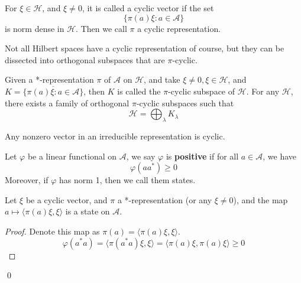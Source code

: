 \begin{definition}
    For $\xi\in\mathcal{H}$, and $\xi\neq 0$, it is called a cyclic vector if the set
    \begin{equation*}
        \{\pi(a)\xi: a\in\mathcal{A}\}
    \end{equation*}
    is norm dense in $\mathcal{H}$. Then we call $\pi$ a cyclic representation.
\end{definition}
Not all Hilbert spaces have a cyclic representation of course, but they can be dissected into orthogonal subspaces that are $\pi$-cyclic.
\begin{proposition}
    Given a *-representation $\pi$ of $\mathcal{A}$ on $\mathcal{H}$, and take $\xi\neq 0, \xi\in\mathcal{H}$, and $K=\overline{\{\pi(a)\xi: a\in\mathcal{A}\}}$, then $K$ is called the $\pi$-cyclic subspace of $\mathcal{H}$. For any $\mathcal{H}$, there exists a family of orthogonal $\pi$-cyclic subspaces such that 
    \begin{equation*}
        \mathcal{H}=\bigoplus_\lambda K_\lambda
    \end{equation*} 
\end{proposition}
\begin{remark}
    Any nonzero vector in an irreducible representation is cyclic.
\end{remark}

\begin{definition}[state]
    Let $\varphi$ be a linear functional on $\mathcal{A}$, we say $\varphi$ is \textbf{positive} if for all $a\in\mathcal{A}$, we have
    \begin{equation*}
        \varphi(aa^*)\geq 0
    \end{equation*}
    Moreover, if $\varphi$ has norm 1, then we call them states.
\end{definition}

\begin{proposition}
    Let $\xi$ be a cyclic vector, and $\pi$ a *-representation (or any $\xi\neq 0$), and the map $a\mapsto \langle \pi(a)\xi, \xi\rangle $ is a state on $\mathcal{A}$.
\end{proposition}
\begin{proof}
    Denote this map as $\pi(a)=\langle \pi(a)\xi, \xi\rangle$.
    \begin{equation*}
        \varphi(a^*a)=\langle \pi(a^*a)\xi, \xi\rangle =\langle \pi(a)\xi, \pi(a)\xi\rangle \geq 0
    \end{equation*}
\end{proof}
\qed


